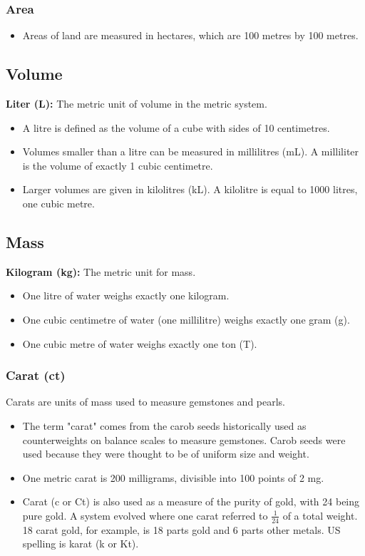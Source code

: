 \documentclass{article}
\begin{document}
\subsubsection*{Area}
\begin{itemize}
\item Areas of land are measured in hectares, which are 100 metres by 100 metres.
\end{itemize}

\subsection*{Volume}
\textbf{Liter (L):} The metric unit of volume in the metric system.

\begin{itemize}
\item A litre is defined as the volume of a cube with sides of 10 centimetres.

\item Volumes smaller than a litre can be measured in millilitres (mL). A milliliter is the volume of exactly 1 cubic centimetre.

\item Larger volumes are given in kilolitres (kL). A kilolitre is equal to 1000 litres, one cubic metre.
\end{itemize}

\subsection*{Mass}
\textbf{Kilogram (kg):} The metric unit for mass.

\begin{itemize}
\item One litre of water weighs exactly one kilogram.

\item One cubic centimetre of water (one millilitre) weighs exactly one gram (g).

\item One cubic metre of water weighs exactly one ton (T).
\end{itemize}

\subsubsection*{Carat (ct)}
Carats are units of mass used to measure gemstones and pearls.
\begin{itemize}
\item The term "carat" comes from the carob seeds historically used as counterweights on balance scales to measure gemstones. Carob seeds were used because they were thought to be of uniform size and weight.
\item One metric carat is 200 milligrams, divisible into 100 points of 2 mg.
\item Carat (c or Ct) is also used as a measure of the purity of gold, with 24 being pure gold. A system evolved where one carat referred to $\frac{1}{24}$ of a total weight. 18 carat gold, for example, is 18 parts gold and 6 parts other metals. US spelling is karat (k or Kt).
\end{itemize}
\end{document}
